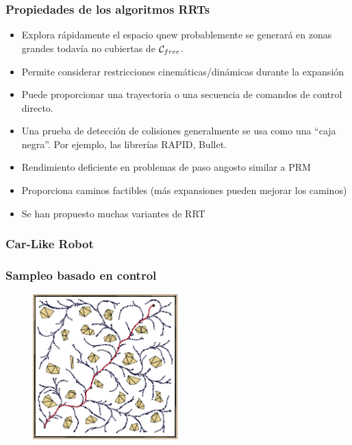 \begin{frame}
	\frametitle{Propiedades de los algoritmos RRTs}

	\begin{itemize}
		\item Explora rápidamente el espacio qnew probablemente se generará en zonas grandes todavía no cubiertas de $\mathcal{C}_{free}$.
		\item Permite considerar restricciones cinemáticas/dinámicas durante la expansión
		\item Puede proporcionar una trayectoria o una secuencia de comandos de control directo.
		\item Una prueba de detección de colisiones generalmente se usa como una ``caja negra''. Por ejemplo, las librerías RAPID, Bullet.
		\item Rendimiento deficiente en problemas de paso angosto similar a PRM
		\item Proporciona caminos factibles (más expansiones pueden mejorar los caminos)
		\item Se han propuesto muchas variantes de RRT
	\end{itemize}
\end{frame}

\begin{frame}
    \frametitle{Car-Like Robot}
    
    
\end{frame}

\begin{frame}
	\frametitle{Sampleo basado en control}
	
	\begin{figure}
		\includegraphics[width=0.5\textwidth]{images/rrt_control_based_sampling.pdf}
	\end{figure}
\end{frame}

